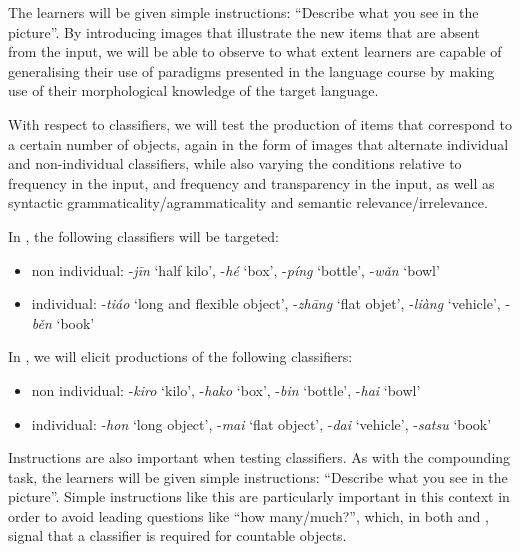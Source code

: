 \documentclass[output=paper,colorlinks,citecolor=brown,modfonts,nonflat]{../langscibook}
\begin{document}
The learners will be given simple instructions: “Describe what you see in the picture”. By introducing images that illustrate the new items that are absent from the input, we will be able to observe to what extent learners are capable of generalising their use of paradigms presented in the language course by making use of their morphological knowledge of the target language. 

With respect to classifiers, we will test the production of items that correspond to a certain number of objects, again in the form of images that alternate individual and non-individual classifiers, while also varying the conditions relative to frequency in the  input, and frequency and transparency in the  input, as well as syntactic grammaticality/agrammaticality and semantic relevance/irrelevance.

In , the following classifiers will be targeted:
\begin{itemize}
  \item  non individual: -\textit{jīn} `half kilo', -\textit{hé} `box', -\textit{píng} `bottle', -\textit{wǎn} `bowl'

  \item individual: -\textit{tiáo} `long and flexible object', -\textit{zhāng} `flat objet', -\textit{liàng} `vehicle', -\textit{běn} `book'
\end{itemize}

In , we will elicit productions of the following classifiers:

\begin{itemize}

  \item  non individual: -\textit{kiro} `kilo', -\textit{hako} `box', -\textit{bin} `bottle', -\textit{hai} `bowl'

  \item  individual: -\textit{hon} `long object', -\textit{mai} `flat object', -\textit{dai} `vehicle', -\textit{satsu} `book'
\end{itemize}

Instructions are also important when testing classifiers. As with the compounding task, the learners will be given simple instructions: “Describe what you see in the picture”. Simple instructions like this are particularly important in this context in order to avoid leading questions like “how many/much?”, which, in both  and , signal that a classifier is required for countable objects. 
\end{document}
